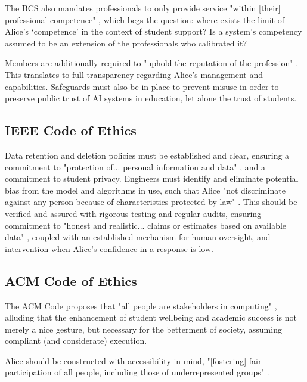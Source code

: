 \documentclass[14pt,a4paper]{article}
\begin{document}
\begin{multicols}{2}
The BCS also mandates professionals to only provide service "within [their] professional competence" \textit{\parencite[p. 2]{BCS2024}}, which begs the question: where exists the limit of Alice's `competence' in the context of student support?
Is a system's competency assumed to be an extension of the professionals who calibrated it?

Members are additionally required to "uphold the reputation of the profession" \textit{\parencite[p. 3]{BCS2024}}.
This translates to full transparency regarding Alice's management and capabilities.
Safeguards must also be in place to prevent misuse in order to preserve public trust of AI systems in education, let alone the trust of students.

\subsection{IEEE Code of Ethics}
Data retention and deletion policies must be established and clear, ensuring a commitment to "protection of... personal information and data" \textit{\parencite[p. 1]{IEEE2024}}, and a commitment to student privacy.
Engineers must identify and eliminate potential bias from the model and algorithms in use, such that Alice "not discriminate against any person because of characteristics protected by law" \textit{\parencite[p. 1]{IEEE2024}}.
This should be verified and assured with rigorous testing and regular audits, ensuring commitment to "honest and realistic... claims or estimates based on available data" \textit{\parencite[p. 2]{IEEE2024}}, coupled with an established mechanism for human oversight, and intervention when Alice's confidence in a response is low.

\subsection{ACM Code of Ethics}
The ACM Code proposes that "all people are stakeholders in computing" \textit{\parencite[p. 1]{ACM2024}}, alluding that the enhancement of student wellbeing and academic success is not merely a nice gesture, but necessary for the betterment of society, assuming compliant (and considerate) execution.

Alice should be constructed with accessibility in mind, "[fostering] fair participation of all people, including those of underrepresented groups" \textit{\parencite[p. 2]{ACM2024}}.


\end{multicols}
\end{document}
